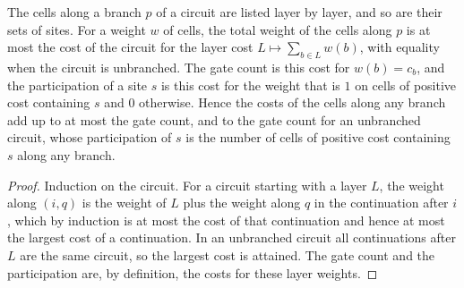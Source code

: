 \begin{lemma}
    \label{lem:circuits_gate_cells}
    \leanok
    The cells along a branch $p$ of a circuit are listed layer by layer, and so are their
    sets of sites. For a weight $w$ of cells, the total weight of the cells along $p$ is at
    most the cost of the circuit for the layer cost $L\mapsto\sum_{b\in L}w(b)$, with
    equality when the circuit is unbranched. The gate count is this cost for $w(b)=c_b$,
    and the participation of a site $s$ is this cost for the weight that is $1$ on cells of
    positive cost containing $s$ and $0$ otherwise. Hence the costs of the cells along any
    branch add up to at most the gate count, and to the gate count for an unbranched
    circuit, whose participation of $s$ is the number of cells of positive cost containing
    $s$ along any branch.
\end{lemma}
\begin{proof}\leanok
    Induction on the circuit. For a circuit starting with a layer $L$, the weight along
    $(i,q)$ is the weight of $L$ plus the weight along $q$ in the continuation after $i$,
    which by induction is at most the cost of that continuation and hence at most the
    largest cost of a continuation. In an unbranched circuit all continuations after $L$
    are the same circuit, so the largest cost is attained. The gate count and the
    participation are, by definition, the costs for these layer weights.
\end{proof}

